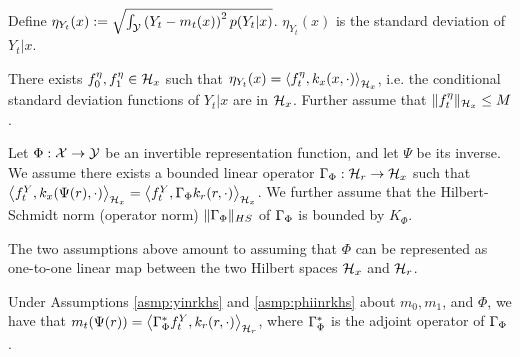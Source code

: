 \begin{thmappdef}\label{def:eta}
Define $\eta_{Y_t}(x) :=\sqrt{\int_\mathcal Y \left(Y_t - m_t(x)\right)^2 p(Y_t|x)}$. $\eta_{Y_t}(x)$ is the standard deviation of $Y_t|x$.
\end{thmappdef}

\begin{thmappasmp}\label{asmp:etainrkhs}
There exists $f^\eta_0, f^\eta_1 \in \mathcal H_x$ such that $\eta_{Y_t}(x) = \left<f^\eta_t,k_x(x,\cdot)\right>_{\mathcal H_x}$, i.e. the conditional standard deviation functions of $Y_t|x$ are in $\mathcal H_x$. Further assume that $\|f^\eta_t\|_{\mathcal H_x} \leq M$.
\end{thmappasmp}
\begin{thmappasmp}\label{asmp:phiinrkhs}
Let $\Phi: \mathcal X \rightarrow \mathcal Y$ be an invertible representation function, and let $\Psi$ be its inverse.
We assume there exists a bounded linear operator $\Gamma_\Phi: \mathcal H_r \rightarrow \mathcal H_x$ such that $\left<f^Y_t,k_x(\Psi(r),\cdot)\right>_{\mathcal H_x} = \left<f^Y_t,\Gamma_\Phi k_r(r,\cdot)\right>_{\mathcal H_x}$. We further assume that the Hilbert-Schmidt norm (operator norm) $\|\Gamma_\Phi\|_{HS}$ of $\Gamma_\Phi$ is bounded by $K_\Phi$.
\end{thmappasmp}

The two assumptions above amount to assuming that $\Phi$ can be represented as one-to-one linear map between the two Hilbert spaces $\mathcal H_x$ and $\mathcal H_r$.

Under Assumptions \ref{asmp:yinrkhs} and \ref{asmp:phiinrkhs} about $m_0,m_1$, and $\Phi$, we have that $m_t(\Psi(r)) = \left<\Gamma_\Phi^* f^Y_t, k_r(r,\cdot)\right>_{\mathcal H_r}$, where $\Gamma_\Phi^*$ is the adjoint operator of $\Gamma_\Phi$ \cite{grunewalder2013smooth}.


